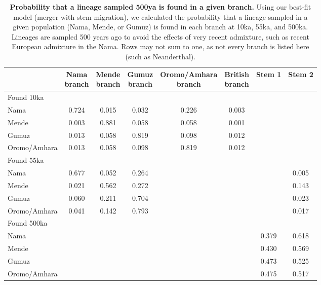 \documentclass[]{article}
\begin{document}
\begin{table}[ht]
\caption{
    \label{tab:supp-lineage-probabilitys}
    \textbf{Probability that a lineage sampled 500ya is found in a given branch.}
    Using our best-fit model (merger with stem migration), we calculated the probability
    that a lineage sampled in a given population (Nama, Mende, or Gumuz) is found in
    each branch at 10ka, 55ka, and 500ka. Lineages are sampled 500 years ago to
    avoid the effects of very recent admixture, such as recent European admixture in
    the Nama. Rows may not sum to one, as not every branch is listed here (such as
    Neanderthal).
}
\centering
\begin{tabular}[t]{lccccccc}
    \toprule
    & \specialcell{Nama\\branch} & \specialcell{Mende\\branch} &
    \specialcell{Gumuz\\branch} & \specialcell{Oromo/Amhara\\branch} & 
    \specialcell{British\\branch} & Stem 1 & Stem 2\\
    \midrule
    Found 10ka & & & & & & & \\
    Nama & 0.724 & 0.015 & 0.032 & 0.226 & 0.003 & & \\
    Mende & 0.003 & 0.881 & 0.058 & 0.058 & 0.001 & & \\
    Gumuz & 0.013 & 0.058 & 0.819 & 0.098 & 0.012 & & \\
    Oromo/Amhara & 0.013 & 0.058 & 0.098 & 0.819 & 0.012 & & \\
    \midrule
    Found 55ka & & & & & & & \\
    Nama & 0.677 & 0.052 & 0.264 & & & & 0.005 \\
    Mende & 0.021 & 0.562 & 0.272 & & & & 0.143 \\
    Gumuz & 0.060 & 0.211 & 0.704 & & & & 0.023 \\
    Oromo/Amhara & 0.041 & 0.142 & 0.793 & & & & 0.017 \\
    \midrule
    Found 500ka & & & & & & & \\
    Nama & & & & & & 0.379 & 0.618 \\
    Mende & & & & & & 0.430 & 0.569 \\
    Gumuz  & & & & & & 0.473 & 0.525 \\
    Oromo/Amhara & & & & & & 0.475 & 0.517 \\
    \bottomrule
\end{tabular}
\end{table}
\end{document}
